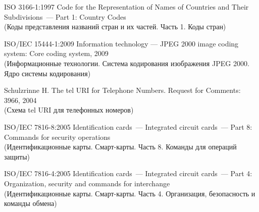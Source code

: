 \clearpage
\renewcommand{\bibname}{Библиография}
\begin{thebibliography}{9}

ISO 3166-1:1997 Code for the Representation of Names of Countries and 
Their Subdivisions~--– Part 1: Country Codes\\
{\small (Коды представления названий стран и их частей. Часть 1. 
Коды стран)}

ISO/IEC 15444-1:2009 Information technology --- 
JPEG 2000 image coding system: Core coding system, 2009\\
{\small (Информационные технологии. Система кодирования изображения JPEG 
2000. Ядро системы кодирования)}

Schulzrinne H. The tel URI for Telephone Numbers. Request for Comments:  3966, 2004\\ 
{\small (Схема tel URI для телефонных номеров)}

ISO/IEC 7816-8:2005 Identification cards~--– Integrated circuit cards~--- 
Part 8: Commands for security operations\\ 
{\small (Идентификационные карты. Смарт-карты. Часть 8. Команды для 
операций защиты)}

ISO/IEC 7816-4:2005 Identification cards~--- Integrated circuit cards~--- 
Part 4: Organization, security and commands for interchange\\
{\small (Идентификационные карты. Смарт-карты. 
Часть 4. Организация, безопасность и команды обмена)}

\label{LastBib}
\end{thebibliography}



